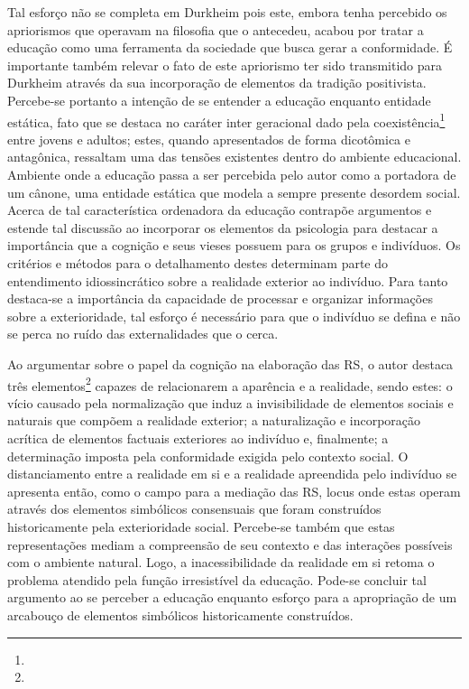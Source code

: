 \documentclass[
  12pt,       %
  openright,      %
  twoside,      %
  a4paper,      %
  english,      %
  french,       %
  spanish,      %
  brazil        %
  ]{abntex2}
\begin{document}
Tal esforço não se completa em Durkheim pois este, embora tenha percebido os apriorismos que operavam na filosofia que o antecedeu, acabou por tratar a educação como uma ferramenta da sociedade que busca gerar a conformidade. É importante também relevar o fato de este apriorismo ter sido transmitido para Durkheim através da sua incorporação de elementos da tradição positivista. Percebe-se portanto a intenção de se entender a educação enquanto entidade estática, fato que se destaca no caráter inter geracional dado pela coexistência\footnote{} entre jovens e adultos; estes, quando apresentados de forma dicotômica e antagônica, ressaltam uma das tensões existentes dentro do ambiente educacional. Ambiente onde a educação passa a ser percebida pelo autor como a portadora de um cânone, uma entidade estática que modela a sempre presente desordem social. Acerca de tal característica ordenadora da educação  contrapõe argumentos e estende tal discussão ao incorporar os elementos da psicologia para destacar a importância que a cognição e seus vieses possuem para os grupos e indivíduos. Os critérios e métodos para o detalhamento destes determinam parte do entendimento idiossincrático sobre a realidade exterior ao indivíduo. Para tanto destaca-se a importância da capacidade de processar e organizar informações sobre a exterioridade, tal esforço é necessário para que o indivíduo se defina e não se perca no ruído das externalidades que o cerca. 

Ao argumentar sobre o papel da cognição na elaboração das RS, o autor destaca três elementos\footnote{} capazes de relacionarem a aparência e a realidade, sendo estes: o vício causado pela normalização que induz a invisibilidade de elementos sociais e naturais que compõem a realidade exterior; a naturalização e incorporação acrítica de elementos factuais exteriores ao indivíduo e, finalmente; a determinação imposta pela conformidade exigida pelo contexto social. O distanciamento entre a realidade em si e a realidade apreendida pelo indivíduo se apresenta então, como o campo para a mediação das RS, locus onde estas operam através dos elementos simbólicos consensuais que foram construídos historicamente pela exterioridade social. Percebe-se também que estas representações mediam a compreensão de seu contexto e das interações possíveis com o ambiente natural. Logo, a inacessibilidade da realidade em si retoma o problema atendido pela função irresistível da educação. Pode-se concluir tal argumento ao se perceber a educação enquanto esforço para a apropriação de um arcabouço de elementos simbólicos historicamente construídos.
\end{document}
